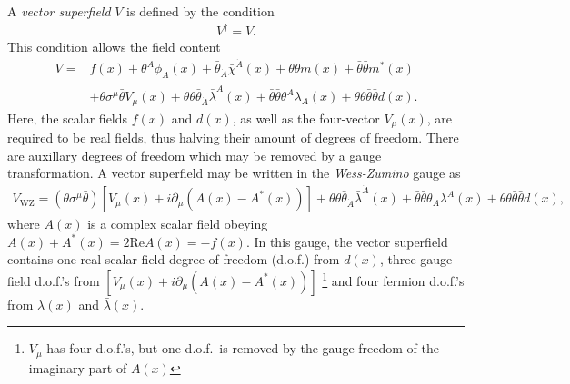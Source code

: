 \documentclass[twoside,english]{uiofysmaster}
\begin{document}
A {\it vector superfield} $V$ is defined by the condition
\begin{align}
	V^\dag = V.
\end{align}
This condition allows the field content
\begin{align}
	V = &f(x) + \theta^A\phi_A(x) + \bar\theta_{\dot A}\bar\chi^{\dot A}(x) + \theta \theta m(x) + \bar\theta \bar\theta m^*(x)\\
	 &+ \theta\sigma^\mu \bar\theta V_\mu(x) + \theta\theta\bar\theta_{\dot A}\bar\lambda^{\dot A}(x) + \bar\theta \bar\theta \theta^A \lambda_A(x) + \theta \theta \bar\theta \bar\theta d(x).
\end{align}
Here, the scalar fields $f(x)$ and $d(x)$, as well as the four-vector $V_\mu (x)$, are required to be real fields, thus halving their amount of degrees of freedom. There are auxillary degrees of freedom which may be removed by a gauge transformation. A vector superfield may be written in the {\it Wess-Zumino} gauge as
\begin{align}
	V_\mathrm{WZ} = (\theta \sigma^\mu \bar\theta) \left[ V_\mu(x) + i\partial_\mu (A(x) - A^*(x)) \right] + \theta\theta \bar\theta_{\dot A} \bar\lambda^{\dot A}(x) + \bar\theta \bar\theta \theta_A \lambda^A(x) + \theta\theta \bar\theta \bar\theta d(x),
\end{align}
where $A(x)$ is a complex scalar field obeying $A(x) + A^*(x) = 2\mathrm{Re}A(x) = -f(x)$. In this gauge, the vector superfield contains one real scalar field degree of freedom (d.o.f.) from $d(x)$, three gauge field d.o.f.'s from $\left[ V_\mu(x) + i\partial_\mu (A(x) - A^*(x)) \right]$ \footnote{$V_\mu$ has four d.o.f.'s, but one d.o.f.\ is removed by the gauge freedom of the imaginary part of $A(x)$} and four fermion d.o.f.'s from $\lambda(x)$ and $\bar\lambda(x)$.
\end{document}
